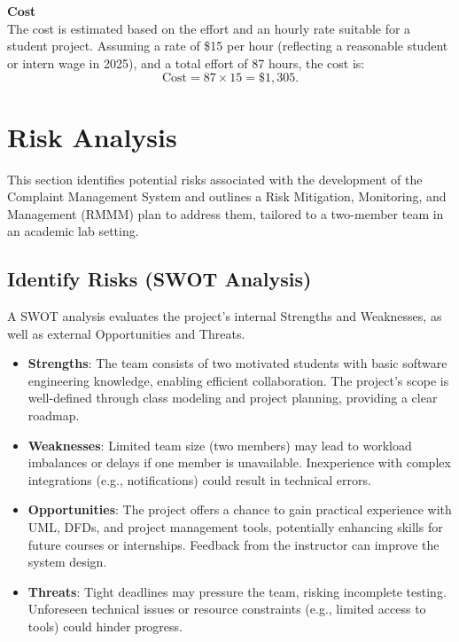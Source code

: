 \documentclass[a4paper,12pt]{article}
\begin{document}
\textbf{Cost}\\
The cost is estimated based on the effort and an hourly rate suitable for a student project. Assuming a rate of \$15 per hour (reflecting a reasonable student or intern wage in 2025), and a total effort of 87 hours, the cost is:
\[
\text{Cost} = 87 \times 15 = \$1,305.
\]



\section{Risk Analysis}

This section identifies potential risks associated with the development of the Complaint Management System and outlines a Risk Mitigation, Monitoring, and Management (RMMM) plan to address them, tailored to a two-member team in an academic lab setting.

\subsection{Identify Risks (SWOT Analysis)}

A SWOT analysis evaluates the project's internal Strengths and Weaknesses, as well as external Opportunities and Threats.

\begin{itemize}
    \item \textbf{Strengths}: The team consists of two motivated students with basic software engineering knowledge, enabling efficient collaboration. The project's scope is well-defined through class modeling and project planning, providing a clear roadmap.
    \item \textbf{Weaknesses}: Limited team size (two members) may lead to workload imbalances or delays if one member is unavailable. Inexperience with complex integrations (e.g., notifications) could result in technical errors.
    \item \textbf{Opportunities}: The project offers a chance to gain practical experience with UML, DFDs, and project management tools, potentially enhancing skills for future courses or internships. Feedback from the instructor can improve the system design.
    \item \textbf{Threats}: Tight deadlines may pressure the team, risking incomplete testing. Unforeseen technical issues or resource constraints (e.g., limited access to tools) could hinder progress.
\end{itemize}
\end{document}
